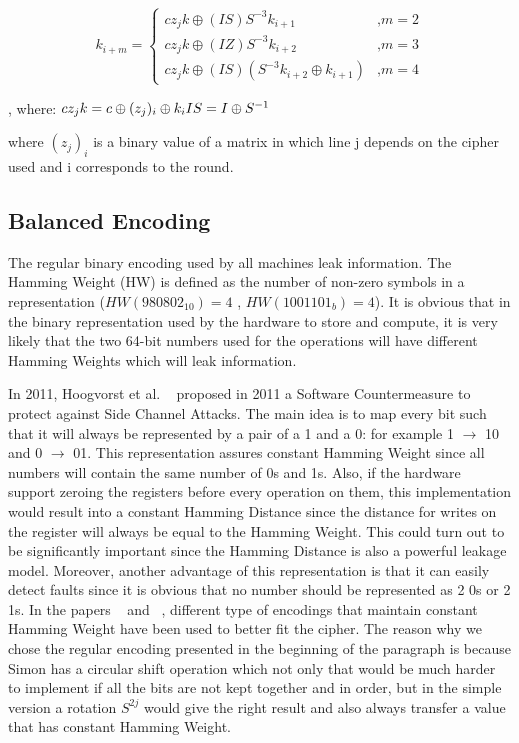 \documentclass[conference]{IEEEtran}
\begin{document}
\small
\begin{equation}
  k_{i+m} =
  \left\{
  \begin{array}{ll}
    cz_{j}k \oplus (IS)S^{-3}k_{i+1} & \mbox{,} m = 2 \\
    cz_{j}k \oplus (IZ)S^{-3}k_{i+2} & \mbox{,} m = 3 \\
    cz_{j}k \oplus (IS)(S^{-3}k_{i+2} \oplus k_{i+1}) & \mbox{,} m = 4 
  \end{array}
  \right.
\end{equation}

, where: $cz_{j}k = c \oplus (z_{j})_{i} \oplus k_{i} \\ IS = I \oplus S^{-1}$

\normalsize

where $(z_{j})_{i}$ is a binary value of a matrix in which line j depends on the cipher used and i corresponds to the round.

\subsection{Balanced Encoding}

The regular binary encoding used by all machines leak information. The Hamming Weight (HW) is defined as the number of non-zero symbols in a representation ($HW(980802_{10}) = 4$ , $HW(1001101_{b}) = 4$). It is obvious that in the binary representation used by the hardware to store and compute, it is very likely that the two 64-bit numbers used for the operations will have different Hamming Weights which will leak information.

In 2011, Hoogvorst et al.  ~\cite{Hoogvorst} proposed in 2011 a Software Countermeasure to protect against Side Channel Attacks. The main idea is to map every bit such that it will always be represented by a pair of a 1 and a 0: for example 1 $\rightarrow$ 10 and 0 $\rightarrow$ 01. This representation assures constant Hamming Weight since all numbers will contain the same number of 0s and 1s. Also, if the hardware support zeroing the registers before every operation on them, this implementation would result into a constant Hamming Distance since the distance for writes on the register will always be equal to the Hamming Weight. This could turn out to be significantly important since the Hamming Distance is also a powerful leakage model. Moreover, another advantage of this representation is that it can easily detect faults since it is obvious that no number should be represented as 2 0s or 2 1s. In the papers ~\cite{BEPrince} and ~\cite{ServantAES}, different type of encodings that maintain constant Hamming Weight have been used to better fit the cipher. The reason why we chose the regular encoding presented in the beginning of the paragraph is because Simon has a circular shift operation which not only that would be much harder to implement if all the bits are not kept together and in order, but in the simple version a rotation $S^{2j}$ would give the right result and also always transfer a value that has constant Hamming Weight.
\end{document}
